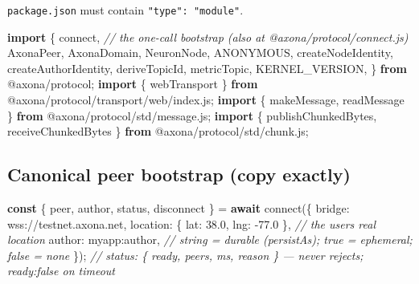 \documentclass[
  nobib]{tufte-handout}
\newenvironment{Shaded}{}{}
\newcommand{\CommentTok}[1]{\textcolor[rgb]{0.38,0.63,0.69}{\textit{#1}}}
\newcommand{\ControlFlowTok}[1]{\textcolor[rgb]{0.00,0.44,0.13}{\textbf{#1}}}
\newcommand{\DataTypeTok}[1]{\textcolor[rgb]{0.56,0.13,0.00}{#1}}
\newcommand{\FloatTok}[1]{\textcolor[rgb]{0.25,0.63,0.44}{#1}}
\newcommand{\FunctionTok}[1]{\textcolor[rgb]{0.02,0.16,0.49}{#1}}
\newcommand{\ImportTok}[1]{\textcolor[rgb]{0.00,0.50,0.00}{\textbf{#1}}}
\newcommand{\KeywordTok}[1]{\textcolor[rgb]{0.00,0.44,0.13}{\textbf{#1}}}
\newcommand{\NormalTok}[1]{#1}
\newcommand{\OperatorTok}[1]{\textcolor[rgb]{0.40,0.40,0.40}{#1}}
\newcommand{\StringTok}[1]{\textcolor[rgb]{0.25,0.44,0.63}{#1}}
\newcounter{none} %
\begin{document}
\texttt{package.json} must contain \texttt{"type":\ "module"}.

\begin{Shaded}
\begin{Highlighting}[]
\ImportTok{import}\NormalTok{ \{}
\NormalTok{  connect}\OperatorTok{,}                                 \CommentTok{// the one{-}call bootstrap (also at @axona/protocol/connect.js)}
\NormalTok{  AxonaPeer}\OperatorTok{,}\NormalTok{ AxonaDomain}\OperatorTok{,}\NormalTok{ NeuronNode}\OperatorTok{,}\NormalTok{ ANONYMOUS}\OperatorTok{,}
\NormalTok{  createNodeIdentity}\OperatorTok{,}\NormalTok{ createAuthorIdentity}\OperatorTok{,}
\NormalTok{  deriveTopicId}\OperatorTok{,}\NormalTok{ metricTopic}\OperatorTok{,}\NormalTok{ KERNEL\_VERSION}\OperatorTok{,}
\NormalTok{\} }\ImportTok{from} \StringTok{\textquotesingle{}@axona/protocol\textquotesingle{}}\OperatorTok{;}
\ImportTok{import}\NormalTok{ \{ webTransport \} }\ImportTok{from} \StringTok{\textquotesingle{}@axona/protocol/transport/web/index.js\textquotesingle{}}\OperatorTok{;}
\ImportTok{import}\NormalTok{ \{ makeMessage}\OperatorTok{,}\NormalTok{ readMessage \} }\ImportTok{from} \StringTok{\textquotesingle{}@axona/protocol/std/message.js\textquotesingle{}}\OperatorTok{;}
\ImportTok{import}\NormalTok{ \{ publishChunkedBytes}\OperatorTok{,}\NormalTok{ receiveChunkedBytes \} }\ImportTok{from} \StringTok{\textquotesingle{}@axona/protocol/std/chunk.js\textquotesingle{}}\OperatorTok{;}
\end{Highlighting}
\end{Shaded}

\subsection{Canonical peer bootstrap (copy
exactly)}\label{canonical-peer-bootstrap-copy-exactly}

\begin{Shaded}
\begin{Highlighting}[]
\KeywordTok{const}\NormalTok{ \{ peer}\OperatorTok{,}\NormalTok{ author}\OperatorTok{,}\NormalTok{ status}\OperatorTok{,}\NormalTok{ disconnect \} }\OperatorTok{=} \ControlFlowTok{await} \FunctionTok{connect}\NormalTok{(\{}
  \DataTypeTok{bridge}\OperatorTok{:}   \StringTok{\textquotesingle{}wss://testnet.axona.net\textquotesingle{}}\OperatorTok{,}
  \DataTypeTok{location}\OperatorTok{:}\NormalTok{ \{ }\DataTypeTok{lat}\OperatorTok{:} \FloatTok{38.0}\OperatorTok{,} \DataTypeTok{lng}\OperatorTok{:} \OperatorTok{{-}}\FloatTok{77.0}\NormalTok{ \}}\OperatorTok{,}   \CommentTok{// the user\textquotesingle{}s real location}
  \DataTypeTok{author}\OperatorTok{:}   \StringTok{\textquotesingle{}myapp:author\textquotesingle{}}\OperatorTok{,}              \CommentTok{// string = durable (persistAs); true = ephemeral; false = none}
\NormalTok{\})}\OperatorTok{;}
\CommentTok{// status: \{ ready, peers, ms, reason \} — never rejects; ready:false on timeout}
\end{Highlighting}
\end{Shaded}
\end{document}

